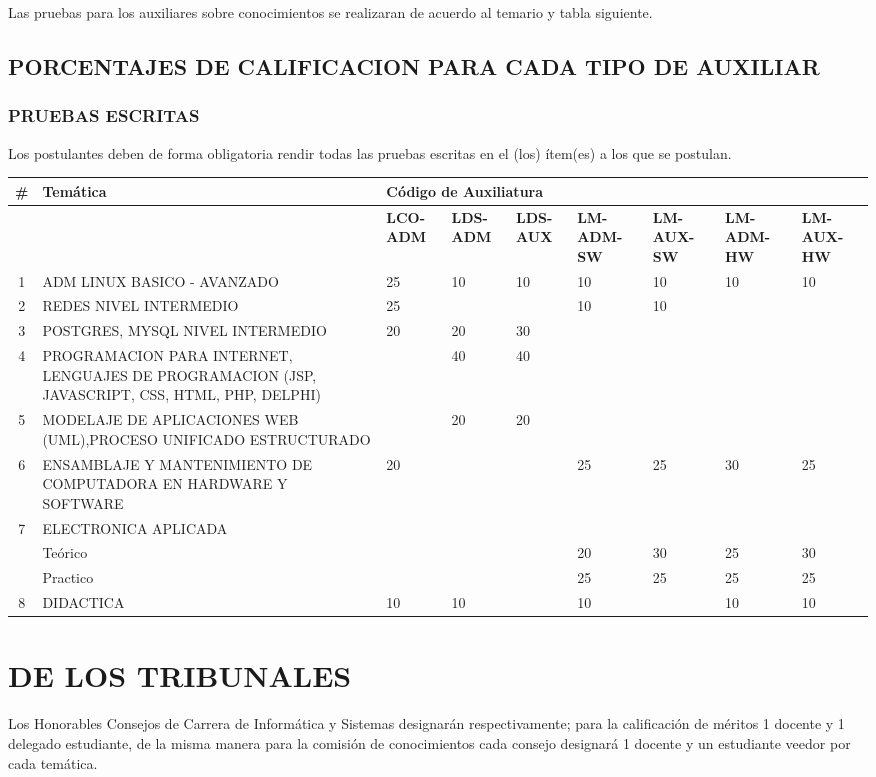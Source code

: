 \documentclass[letterpaper,11pt]{article}
\begin{document}
Las pruebas para los auxiliares sobre conocimientos se realizaran de acuerdo al temario y tabla siguiente.

\subsection{PORCENTAJES DE CALIFICACION PARA CADA TIPO DE AUXILIAR}
\subsubsection{PRUEBAS ESCRITAS}
Los postulantes deben de forma obligatoria rendir todas las pruebas escritas en el (los) ítem(es) a los que se postulan.

\begin{tabular}{|c|p{5.8cm}|p{0.8cm}|p{0.8cm}|p{0.8cm}|p{0.8cm}|p{0.8cm}|p{0.8cm}|p{0.8cm}|}
\hline
 \textbf{\#  } & \textbf{Temática} & \multicolumn{7}{|l|}{\textbf{Código de Auxiliatura}} \\
\hline
  &  & \textbf{\textbf{LCO-ADM}} & \textbf{LDS-ADM} & \textbf{LDS-AUX} & \textbf{LM-ADM-SW} & \textbf{LM-AUX-SW} & \textbf{LM-ADM-HW} & \textbf{LM-AUX-HW} \\
\hline
 1 & ADM LINUX BASICO - AVANZADO & 25 & 10 & 10 & 10 & 10 & 10 & 10 \\
\hline
 2 & REDES NIVEL INTERMEDIO & 25 &  &  & 10 & 10 &  &  \\
\hline
 3 & POSTGRES, MYSQL NIVEL INTERMEDIO & 20 & 20 & 30 &  &  &  &  \\
\hline
 4 & PROGRAMACION PARA INTERNET, LENGUAJES DE PROGRAMACION (JSP, JAVASCRIPT, CSS, HTML, PHP, DELPHI) &  & 40 & 40 &  &  &  &  \\
\hline
 5 & MODELAJE DE APLICACIONES WEB (UML),PROCESO UNIFICADO ESTRUCTURADO &  & 20 & 20 &  &  &  &  \\
\hline
 6 & ENSAMBLAJE Y MANTENIMIENTO DE COMPUTADORA EN HARDWARE Y SOFTWARE & 20 &  &  & 25 & 25 & 30 & 25 \\
\hline
 7 & ELECTRONICA APLICADA & \multicolumn{7}{|l|}{} \\
\hline
  & Teórico &  &  &  & 20 & 30 & 25 & 30 \\
\hline
  & Practico &  &  &  & 25 & 25 & 25 & 25 \\
\hline
 8 & DIDACTICA & 10 & 10 &  & 10 &  & 10 & 10 \\
\hline
\end{tabular}

\section{DE LOS TRIBUNALES}
Los Honorables Consejos de Carrera de Informática y Sistemas designarán respectivamente; para la calificación de méritos 1 docente y 1 delegado estudiante, de la misma manera para la comisión de conocimientos cada consejo designará 1 docente y un estudiante veedor por cada temática.
\end{document}
